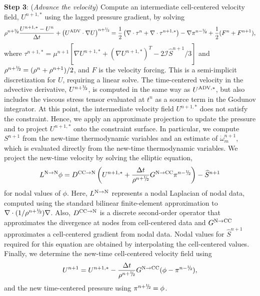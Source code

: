{\bf Step 3}: ({\it Advance the velocity}) Compute an intermediate cell-centered velocity field, 
$U^{n+1,*}$ using the lagged pressure gradient, by solving
\begin{equation}
\rho^{n+\myhalf}\frac{U^{n+1,*}-U^n}{\Delta t} + \left(\uadv\cdot\nabla U\right)^{n+\myhalf} = \half\left(\nabla\cdot\tau^n + \nabla\cdot\tau^{n+1,*}\right) - \nabla\pi^{n-\myhalf} + \frac{1}{2}(F^n + F^{n+1}),
\end{equation}
where $\tau^{n+1,*} = \mu^{n+1}[\nabla U^{n+1,*} +(\nabla U^{n+1,*})^T - 2\mathcal{I}\widehat S^{n+1}/3]$ and 
$\rho^{n+\myhalf} = (\rho^n + \rho^{n+1})/2$, and $F$ is the velocity forcing.  This is a semi-implicit discretization for $U$, requiring
a linear solve.  The time-centered velocity in the advective derivative,
$U^{n+\myhalf}$, is computed in the same way 
as $U^{{\rm ADV},*}$, but also includes the viscous stress tensor evaluated at $t^n$ as a source term
in the Godunov integrator.  At 
this point, the intermediate velocity field $U^{n+1,*}$ does not satisfy the constraint.  Hence, we apply an 
approximate projection to update the pressure and to project $U^{n+1,*}$ onto the constraint surface.  
In particular, we compute $S^{n+1}$ from the new-time 
thermodynamic variables and an estimate of $\dot\omega_m^{n+1}$, which is evaluated
directly from the new-time thermodynamic variables. We project the new-time velocity by solving the elliptic equation,
\begin{equation}
L^{{\rm N}\rightarrow{\rm N}}\phi = D^{{\rm CC}\rightarrow{\rm N}}\left(U^{n+1,*} + \frac{\Delta t}{\rho^{n+\myhalf}}G^{{\rm N}\rightarrow{\rm CC}}\pi^{n-\myhalf}\right) - \widehat S^{n+1}
\end{equation}
for nodal values of $\phi$.  Here, $L^{{\rm N}\rightarrow{\rm N}}$ represents a nodal Laplacian of nodal data, computed
using the standard bilinear finite-element approximation to $\nabla\cdot(1/\rho^{n+\myhalf})\nabla$.
Also, $D^{{\rm CC}\rightarrow{\rm N}}$ is a discrete
second-order operator that approximates the divergence at nodes from cell-centered data 
and $G^{{\rm N}\rightarrow{\rm CC}}$ approximates a cell-centered gradient from nodal data.  Nodal 
values for $\widehat S^{n+1}$ required for this equation are obtained by interpolating the cell-centered values.  Finally, we 
determine the new-time cell-centered velocity field using
\begin{equation}
U^{n+1} = U^{n+1,*} - \frac{\Delta t}{\rho^{n+\myhalf}}G^{{\rm N}\rightarrow{\rm CC}}(\phi-\pi^{n-\myhalf}),
\end{equation}
and the new time-centered pressure using $\pi^{n+\myhalf} = \phi$.


